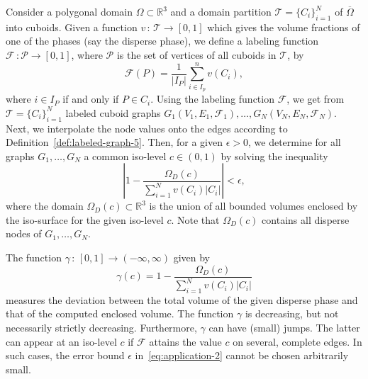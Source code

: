\documentclass[a4paper,11pt]{article}
\begin{document}
Consider a polygonal domain $\Omega\subset\mathbb{R}^3$ and a domain partition
$\mathcal{T}=\{C_i\}_{i=1}^N$ of $\overline{\Omega}$ into cuboids. Given a function $v\,:\,\mathcal{T}
\longrightarrow [0,1]$ which gives the volume fractions of one of the phases (say the disperse phase),
we define a labeling function $\mathcal{F}\,:\mathcal{P}\longrightarrow [0,1]$, where $\mathcal{P}$
is the set of vertices of all cuboids in $\mathcal{T}$, by
\begin{equation}
\mathcal{F}(P)=\frac{1}{|I_P|}\sum_{i\in I_p}^nv(C_i),
\label{eq:application-1}
\end{equation}
where $i\in I_P$ if and only if $P\in C_i$. Using the labeling function $\mathcal{F}$, we get from
$\mathcal{T}=\{C_i\}_{i=1}^N$ labeled cuboid graphs $G_1(V_1,E_1,\mathcal{F}_1),\ldots,G_N(V_N,E_N,\mathcal{F}_N)$.
Next, we interpolate the node values onto the edges according to \mbox{Definition}~\ref{def:labeled-graph-5}. Then, for
a given $\epsilon>0$, we determine for all graphs $G_1,\ldots,G_N$ a common iso-level $c\in (0,1)$ by solving the
inequality
\begin{equation}
\left|1-\frac{\Omega_{D}(c)}{\sum_{i=1}^Nv(C_i)|C_i|}\right|<\epsilon,
\label{eq:application-2}
\end{equation}
where the domain $\Omega_{D}(c)\subset\mathbb{R}^3$ is the union of all bounded volumes enclosed by
the iso-surface for the given iso-level $c$. Note that $\Omega_{D}(c)$ contains all disperse nodes
of $G_1,\ldots,G_N$.

The function $\gamma\,:\,[0,1]\longrightarrow (-\infty,\infty)$ given by
\begin{equation}
\gamma(c)=1-\frac{\Omega_{D}(c)}{\sum_{i=1}^Nv(C_i)|C_i|}
\label{eq:application-3}
\end{equation}
measures the deviation between the total volume of the given disperse phase and that of the computed
enclosed volume. The function $\gamma$ is decreasing, but not necessarily strictly decreasing.
Furthermore, $\gamma$ can have (small) jumps. The latter can appear at an iso-level $c$ if
$\mathcal{F}$ attains the value $c$ on several, complete edges. In such cases, the error bound $\epsilon$
in~\eqref{eq:application-2} cannot be chosen arbitrarily small.
\end{document}
